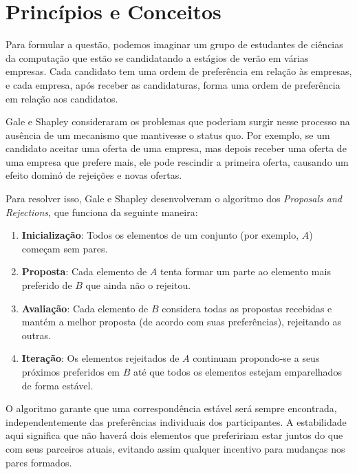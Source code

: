 \documentclass[12pt]{article}
\begin{document}
\section{Princípios e Conceitos}


Para formular a questão, podemos imaginar um grupo de estudantes de ciências da computação que estão se candidatando a estágios de verão em várias empresas. Cada candidato tem uma ordem de preferência em relação às empresas, e cada empresa, após receber as candidaturas, forma uma ordem de preferência em relação aos candidatos.

Gale e Shapley consideraram os problemas que poderiam surgir nesse processo na ausência de um mecanismo que mantivesse o status quo. Por exemplo, se um candidato aceitar uma oferta de uma empresa, mas depois receber uma oferta de uma empresa que prefere mais, ele pode rescindir a primeira oferta, causando um efeito dominó de rejeições e novas ofertas.

Para resolver isso, Gale e Shapley desenvolveram o algoritmo dos \textit{Proposals and Rejections}, que funciona da seguinte maneira:

\begin{enumerate}
    \item \textbf{Inicialização}: Todos os elementos de um conjunto (por exemplo, \( A \)) começam sem pares.
    \item \textbf{Proposta}: Cada elemento de \( A \) tenta formar um parte ao elemento mais preferido de \( B \) que ainda não o rejeitou.
    \item \textbf{Avaliação}: Cada elemento de \( B \) considera todas as propostas recebidas e mantém a melhor proposta (de acordo com suas preferências), rejeitando as outras.
    \item \textbf{Iteração}: Os elementos rejeitados de \( A \) continuam propondo-se a seus próximos preferidos em \( B \) até que todos os elementos estejam emparelhados de forma estável.
\end{enumerate}

O algoritmo garante que uma correspondência estável será sempre encontrada, independentemente das preferências individuais dos participantes. A estabilidade aqui significa que não haverá dois elementos que prefeririam estar juntos do que com seus parceiros atuais, evitando assim qualquer incentivo para mudanças nos pares formados.
\end{document}
